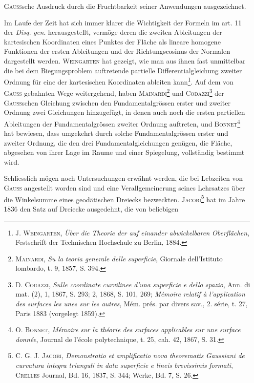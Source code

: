 \textsc{Gauss}sche Ausdruck durch die Fruchtbarkeit seiner Anwendungen ausgezeichnet.
\par
Im Laufe der Zeit hat sich immer klarer die Wichtigkeit der Formeln
im art. 11 der \textit{Disq. gen.} herausgestellt, vermöge deren die zweiten Ableitungen
der kartesischen Koordinaten eines Punktes der Fläche als lineare homogene
Funktionen der ersten Ableitungen und der Richtungscosinus der Normalen
dargestellt werden. \textsc{Weingarten} hat gezeigt, wie man aus ihnen fast unmittelbar
die bei dem Biegungsproblem auftretende partielle Differentialgleichung
zweiter Ordnung für eine der kartesischen Koordinaten ableiten kann\footnote{\textsc{J. Weingarten}, \textit{Über die Theorie der auf einander abwickelbaren Oberflächen}, Festschrift der Technischen Hochschule zu Berlin, 1884.}. Auf
dem von \textsc{Gauss} gebahnten Wege weitergehend, haben \textsc{Mainardi}\footnote{\textsc{Mainardi}, \textit{Su la teoria generale delle superficie}, Giornale dell’Istituto lombardo, t. 9, 1857, S. 394.} und \textsc{Codazzi}\footnote{\textsc{D. Codazzi}, \textit{Sulle coordinate curvilinee d’una superficie e dello spazio}, Ann. di mat. (2), 1, 1867, S. 293; 2, 1868, S. 101, 269; \textit{Mémoire relatif à l’application des surfaces les unes sur les autres}, Mém. prés. par divers sav., 2. série, t. 27, Paris 1883 (vorgelegt 1859).}
\clearpage{}\setcounter{footnote}{0}
\noindent der \textsc{Gauss}schen Gleichung zwischen den Fundamentalgrössen erster und zweiter
Ordnung zwei Gleichungen hinzugefügt, in denen auch noch die ersten partiellen
Ableitungen der Fundamentalgrössen zweiter Ordnung auftreten, und
\textsc{Bonnet}\footnote{\textsc{O. Bonnet}, \textit{Mémoire sur la théorie des surfaces applicables sur une surface donnée}, Journal de l’école polytechnique, t. 25, cah. 42, 1867, S. 31.} hat bewiesen, dass umgekehrt durch solche Fundamentalgrössen
erster und zweiter Ordnung, die den drei Fundamentalgleichungen genügen,
die Fläche, abgesehen von ihrer Lage im Raume und einer Spiegelung, vollständig
bestimmt wird.
\par
Schliesslich mögen noch Untersuchungen erwähnt werden, die bei Lebzeiten
von \textsc{Gauss} angestellt worden sind und eine Verallgemeinerung seines
Lehrsatzes über die Winkelsumme eines geodätischen Dreiecks bezweckten.
\textsc{Jacobi}\footnote{\textsc{C. G. J. Jacobi}, \textit{Demonstratio et amplificatio nova theorematis Gaussiani de curvatura integra trianguli in data superficie e lineis brevissimis formati}, \textsc{Crelles} Journal, Bd. 16, 1837, S. 344; Werke, Bd. 7, S. 26.} hat im Jahre 1836 den Satz auf Dreiecke ausgedehnt, die von beliebigen
